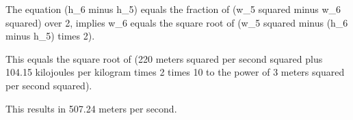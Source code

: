The equation (h_6 minus h_5) equals the fraction of (w_5 squared minus w_6 squared) over 2, implies w_6 equals the square root of (w_5 squared minus (h_6 minus h_5) times 2).

This equals the square root of (220 meters squared per second squared plus 104.15 kilojoules per kilogram times 2 times 10 to the power of 3 meters squared per second squared).

This results in 507.24 meters per second.